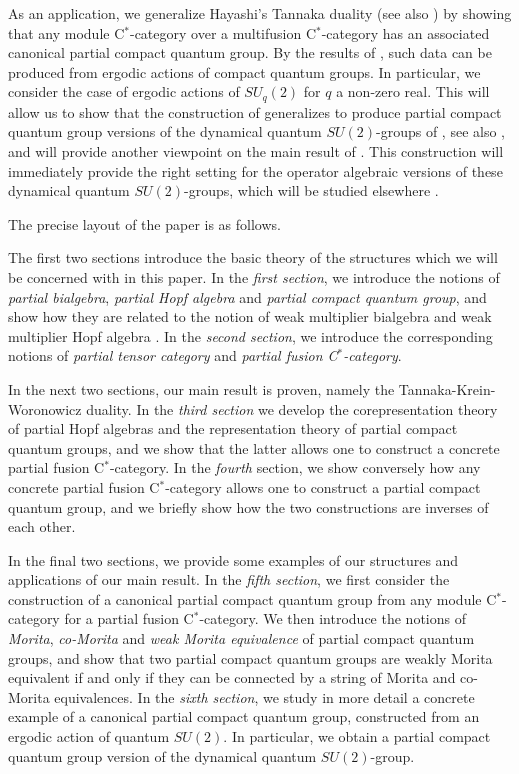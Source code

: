 \documentclass[10pt]{article}
\theoremstyle{definition}
\numberwithin{equation}{section}
\begin{document}
As an application, we generalize Hayashi's Tannaka duality \cite{Hay8} (see also \cite{Ost1}) by showing that any module C$^*$-category over a multifusion C$^*$-category has an associated canonical partial compact quantum group. %
By the results of \cite{DCY1}, such data can be produced from ergodic actions of compact quantum groups. In particular,  we consider the case of ergodic actions of $SU_q(2)$ for $q$ a non-zero real. This will allow us to show that the construction of \cite{Hay4} generalizes to produce partial compact quantum group versions of the dynamical quantum $SU(2)$-groups of \cite{EtV1,KoR1}, see also \cite{EtN1}, and will provide another viewpoint on the main result of \cite{Sto1}. This construction will immediately provide the right setting for the operator algebraic versions of these dynamical quantum $SU(2)$-groups, which will be studied elsewhere \cite{DCT2}.

The precise layout of the paper is as follows.

The first two sections introduce the basic theory of the structures which we will be concerned with in this paper. In the \emph{first section}, we introduce the notions of \emph{partial bialgebra}, \emph{partial Hopf algebra} and \emph{partial compact quantum group}, and show how they are related to the notion of weak multiplier bialgebra \cite{Boh1} and weak multiplier Hopf algebra \cite{VDW1,VDW2}. In the \emph{second section}, we introduce the corresponding notions of \emph{partial tensor category} and \emph{partial fusion C$^*$-category}. 

In the next two sections, our main result is proven, namely the Tannaka-Krein-Woronowicz duality. In the \emph{third section} we develop the corepresentation theory of partial Hopf algebras and the representation theory of partial compact quantum groups, and we show that the latter allows one to construct a concrete partial fusion C$^*$-category. In the \emph{fourth} section, we show conversely how any concrete partial fusion C$^*$-category allows one to construct a partial compact quantum group, and we briefly show how the two constructions are inverses of each other.

In the final two sections, we provide some examples of our structures and applications of our main result. In the \emph{fifth section}, we first consider the construction of a canonical partial compact quantum group from any module C$^*$-category for a partial fusion C$^*$-category. We then introduce the notions of \emph{Morita}, \emph{co-Morita} and \emph{weak Morita equivalence} \cite{Mug1} of partial compact quantum groups, and show that two partial compact quantum groups are weakly Morita equivalent if and only if they can be connected by a string of Morita and co-Morita equivalences. In the \emph{sixth section}, we study in more detail a concrete example of a canonical partial compact quantum group, constructed from an ergodic action of quantum $SU(2)$. In particular, we obtain a partial compact quantum group version of the dynamical quantum $SU(2)$-group. 
\end{document}
